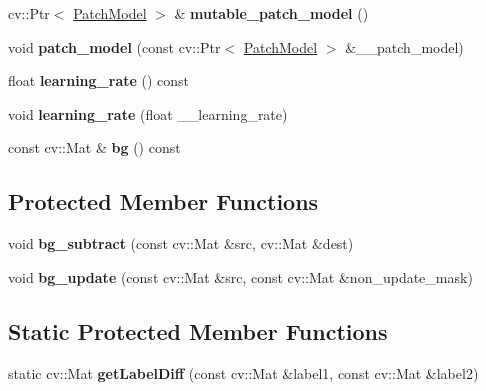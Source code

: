 \begin{DoxyCompactItemize}
cv\+::\+Ptr$<$ \hyperlink{classskl_1_1_patch_model}{Patch\+Model} $>$ \& {\bfseries mutable\+\_\+patch\+\_\+model} ()
\item 
\hypertarget{classskl_1_1_table_object_manager_a40257940163b4116584eea70a3310f59}{}\label{classskl_1_1_table_object_manager_a40257940163b4116584eea70a3310f59} 
void {\bfseries patch\+\_\+model} (const cv\+::\+Ptr$<$ \hyperlink{classskl_1_1_patch_model}{Patch\+Model} $>$ \&\+\_\+\+\_\+patch\+\_\+model)
\item 
\hypertarget{classskl_1_1_table_object_manager_a4340ee7786af706e3e16077a7c0b8779}{}\label{classskl_1_1_table_object_manager_a4340ee7786af706e3e16077a7c0b8779} 
float {\bfseries learning\+\_\+rate} () const
\item 
\hypertarget{classskl_1_1_table_object_manager_a55e36bd8d5138230bdf99c7726e8d786}{}\label{classskl_1_1_table_object_manager_a55e36bd8d5138230bdf99c7726e8d786} 
void {\bfseries learning\+\_\+rate} (float \+\_\+\+\_\+learning\+\_\+rate)
\item 
\hypertarget{classskl_1_1_table_object_manager_a8317c0fdfe7a09b8ae9dcfc83f4bc51e}{}\label{classskl_1_1_table_object_manager_a8317c0fdfe7a09b8ae9dcfc83f4bc51e} 
const cv\+::\+Mat \& {\bfseries bg} () const
\end{DoxyCompactItemize}
\subsection*{Protected Member Functions}
\begin{DoxyCompactItemize}
\item 
\hypertarget{classskl_1_1_table_object_manager_a8a88ee3a319f012644ac373b50f4dd9a}{}\label{classskl_1_1_table_object_manager_a8a88ee3a319f012644ac373b50f4dd9a} 
void {\bfseries bg\+\_\+subtract} (const cv\+::\+Mat \&src, cv\+::\+Mat \&dest)
\item 
\hypertarget{classskl_1_1_table_object_manager_a473f00daa9e321ecc3f5b4c5540cb8b5}{}\label{classskl_1_1_table_object_manager_a473f00daa9e321ecc3f5b4c5540cb8b5} 
void {\bfseries bg\+\_\+update} (const cv\+::\+Mat \&src, const cv\+::\+Mat \&non\+\_\+update\+\_\+mask)
\end{DoxyCompactItemize}
\subsection*{Static Protected Member Functions}
\begin{DoxyCompactItemize}
\item 
\hypertarget{classskl_1_1_table_object_manager_a25e29c75c08f42a3723a0621bbc4bff6}{}\label{classskl_1_1_table_object_manager_a25e29c75c08f42a3723a0621bbc4bff6} 
static cv\+::\+Mat {\bfseries get\+Label\+Diff} (const cv\+::\+Mat \&label1, const cv\+::\+Mat \&label2)
\end{DoxyCompactItemize}
